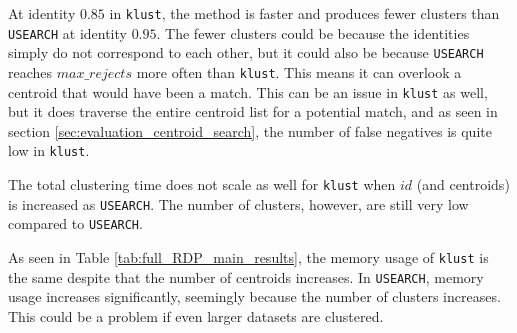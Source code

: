 At identity $0.85$ in \texttt{klust}, the method is faster and produces fewer
clusters than \texttt{USEARCH} at identity $0.95$. The fewer clusters could be
because the identities simply do not correspond to each other, but it could
also be because \texttt{USEARCH} reaches $max\_rejects$ more often than
\texttt{klust}. This means it can overlook a centroid that would have been a
match. This can be an issue in \texttt{klust} as well, but it does traverse
the entire centroid list for a potential match, and as seen in section
\ref{sec:evaluation_centroid_search}, the number of false negatives is quite
low in \texttt{klust}.

The total clustering time does not scale as well for \texttt{klust} when $id$
(and centroids) is increased as \texttt{USEARCH}. The number of clusters,
however, are still very low compared to \texttt{USEARCH}.

As seen in Table \ref{tab:full_RDP_main_results}, the memory usage of
\texttt{klust} is the same despite that the number of centroids increases. In
\texttt{USEARCH}, memory usage increases significantly, seemingly because the
number of clusters increases. This could be a problem if even larger datasets
are clustered.
